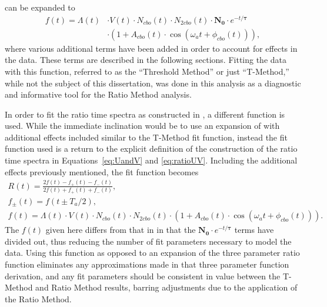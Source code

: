  can be expanded to 
    \begin{equation}
    \begin{aligned}
        f(t) = \Lambda(t)& \cdot V(t) \cdot N_{cbo}(t) \cdot N_{2cbo}(t) \cdot \boldsymbol{N_{0}} \cdot e^{-t/\boldsymbol{\tau}}  \\
         & \cdot (1 + A_{cbo}(t) \cdot \cos(\omega_{a}t + \phi_{cbo}(t))),
    \label{eq:TmethodFunction}
    \end{aligned}
    \end{equation}
where various additional terms have been added in order to account for effects in the data. These terms are described in the following sections. Fitting the data with this function, referred to as the ``Threshold Method'' or just ``T-Method,'' while not the subject of this dissertation, was done in this analysis as a diagnostic and informative tool for the Ratio Method analysis. 


In order to fit the ratio time spectra as constructed in , a different function is used. While the immediate inclination would be to use an expansion of  with additional effects included similar to the T-Method fit function, instead the fit function used is a return to the explicit definition of the construction of the ratio time spectra in Equations~\ref{eq:UandV} and \ref{eq:ratioUV}. Including the additional effects previously mentioned, the fit function becomes
    \begin{gather}
        R(t) = \frac{2f(t) - f_{+}(t) - f_{-}(t)}{2f(t) + f_{+}(t) + f_{-}(t)}, \\
        f_{\pm}(t) = f(t \pm T_{a}/2), \\
        f(t) = \Lambda(t) \cdot V(t) \cdot N_{cbo}(t) \cdot N_{2cbo}(t) \cdot (1 + A_{cbo}(t) \cdot \cos(\omega_{a}t + \phi_{cbo}(t))).
    \label{eq:fullratiofunction}
    \end{gather}
The $f(t)$ given here differs from that in  in that the $\boldsymbol{N_{0}} \cdot e^{-t/\boldsymbol{\tau}}$ terms have divided out, thus reducing the number of fit parameters necessary to model the data. Using this function as opposed to an expansion of the three parameter ratio function eliminates any approximations made in that three parameter function derivation, and any fit parameters should be consistent in value between the T-Method and Ratio Method results, barring adjustments due to the application of the Ratio Method. 

